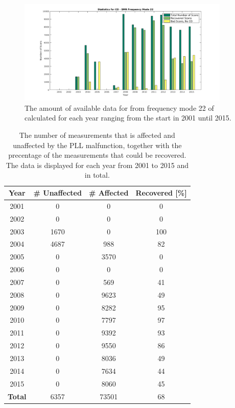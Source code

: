 \begin{figure}[ht!]
\begin{center}
\includegraphics[width=0.9\textwidth]{freq_corr_statistics.png}
\caption{The amount of available data for  from frequency mode 22 of \smr\, calculated for each year ranging from the start in 2001 until 2015.}
\label{fig:statisticsCO}
\end{center}
\end{figure}


\begin{table}[ht!]
    \caption{The number of measurements that is affected and unaffected by the PLL malfunction, together with the precentage of the measurements that could be recovered. The data is displayed for each year from 2001 to 2015 and in total.}
    \label{table:statisticsCO}
    \begin{center}
        \begin{tabular}{|c|c|c|c|} \hline 
         \bf{Year} & \bf{\# Unaffected} & \bf{\# Affected} & \bf{Recovered [\%]} \\ \hline
         2001 & 0 & 0 & 0 \\ \hline
         2002 & 0 & 0 & 0 \\ \hline
         2003 & 1670 & 0 & 100 \\ \hline
         2004 & 4687 & 988 & 82 \\ \hline
         2005 & 0 & 3570 & 0 \\ \hline
         2006 & 0 & 0 & 0 \\ \hline
         2007 & 0 & 569 & 41 \\ \hline
         2008 & 0 & 9623 & 49 \\ \hline
         2009 & 0 & 8282 &  95 \\ \hline
         2010 & 0 & 7797 & 97 \\ \hline
         2011 & 0 & 9392 & 93 \\ \hline
         2012 & 0 & 9550 & 86 \\ \hline
         2013 & 0 & 8036 & 49 \\ \hline
         2014 & 0 & 7634 & 44 \\ \hline
         2015 & 0 & 8060 & 45 \\ \hline
         \bf{Total} & 6357 & 73501 & 68 \\ \hline
        \end{tabular}
    \end{center}
\end{table}

